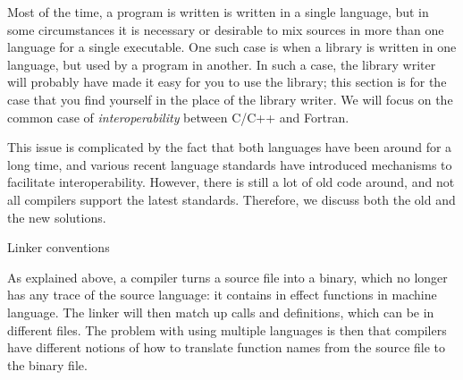 

Most of the time, a program is written is written in a single
language, but in some circumstances it is necessary or desirable to
mix sources in more than one language for a single executable. One
such case is when a library is written in one language, but used by a
program in another. In such a case, the library writer will probably
have made it easy for you to use the library; this section is for the
case that you find yourself in the place of the library writer. We
will focus on the common case of \emph{interoperability} between C/C++ and
Fortran.

This issue is complicated by the fact that both languages have
been around for a long time, and various recent language standards
have introduced mechanisms to facilitate interoperability.
However, there is still a lot of old code around, and not all compilers
support the latest standards. Therefore, we discuss both the old 
and the new solutions.

 {Linker conventions}

As explained above, a compiler turns a source file into a binary,
which no longer has any trace of the source language: it contains in
effect functions in machine language. The linker will then match up
calls and definitions, which can be in different files. The problem
with using multiple languages is then that compilers have different
notions of how to translate function names from the source file to the
binary file.

